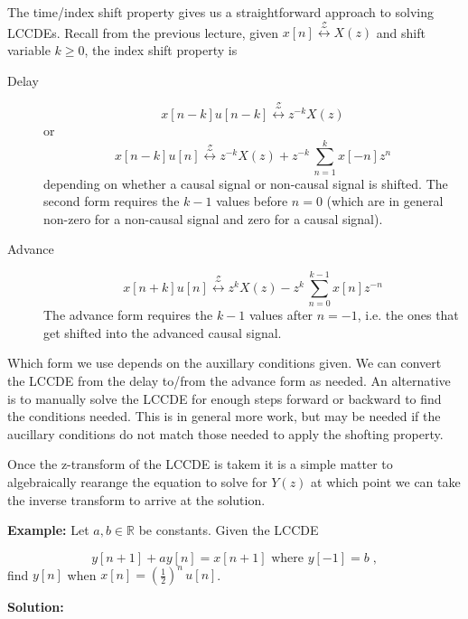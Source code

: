 \documentclass{article}
\begin{document}
The time/index shift property gives us a straightforward approach to solving LCCDEs. Recall from the previous lecture, given $x[n] \stackrel{\mathcal{Z}}{\longleftrightarrow} X(z)$ and shift variable $k \geq 0$, the index shift property is

\begin{description}
\item[Delay]  
  \[
  x[n-k]u[n-k] \stackrel{\mathcal{Z}}{\longleftrightarrow} z^{-k} X(z)
  \]
  or
  \[
  x[n-k]u[n] \stackrel{\mathcal{Z}}{\longleftrightarrow} z^{-k} X(z) + z^{-k}\, \sum\limits_{n=1}^{k} x[-n] z^n
  \]
  depending on whether a causal signal or non-causal signal is shifted. The second form requires the $k-1$ values before $n = 0$ (which are in general non-zero for a non-causal signal and zero for a causal signal).
\item[Advance]
  \[
  x[n+k]u[n] \stackrel{\mathcal{Z}}{\longleftrightarrow} z^{k} X(z) - z^{k}\, \sum\limits_{n=0}^{k-1} x[n] z^{-n}
  \]
  The advance form requires the $k-1$ values after $n = -1$, i.e. the ones that get shifted into the advanced causal signal.
\end{description}

Which form we use depends on the auxillary conditions given. We can convert the LCCDE from the delay to/from the advance form as needed. An alternative is to manually solve the LCCDE for enough steps forward or backward to find the conditions needed. This is in general more work, but may be needed if the aucillary conditions do not match those needed to apply the shofting property.

Once the z-transform of the LCCDE is takem it is a simple matter to algebraically rearange the equation to solve for $Y(z)$ at which point we can take the inverse transform to arrive at the solution.

\textbf{Example:} Let $a,b \in\mathbb{R}$ be constants. Given the LCCDE

\[
y[n+1] + ay[n] = x[n+1] \mbox{ where } y[-1] = b\; ,
\]
find $y[n]$ when $x[n] = \left(\frac{1}{2}\right)^n\, u[n]$.

\textbf{Solution:}
\end{document}
